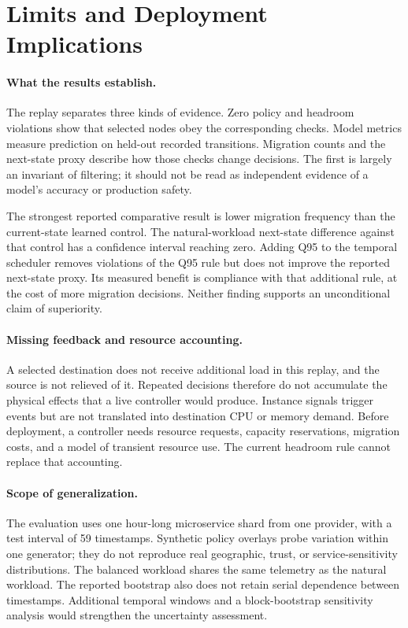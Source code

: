 \section{Limits and Deployment Implications}\label{sec:discussion}
\paragraph{What the results establish.}
The replay separates three kinds of evidence. Zero policy and headroom
violations show that selected nodes obey the corresponding checks.
Model metrics measure prediction on held-out recorded transitions.
Migration counts and the next-state proxy describe how those checks change
decisions. The first is largely an invariant of filtering; it should not
be read as independent evidence of a model's accuracy or production safety.

The strongest reported comparative result is lower migration frequency
than the current-state learned control. The natural-workload next-state
difference against that control has a confidence interval reaching zero.
Adding Q95 to the temporal scheduler removes violations of the Q95 rule
but does not improve the reported next-state proxy. Its measured benefit
is compliance with that additional rule, at the cost of more migration
decisions. Neither finding supports an unconditional claim of superiority.

\paragraph{Missing feedback and resource accounting.}
A selected destination does not receive additional load in this replay,
and the source is not relieved of it. Repeated decisions therefore do not
accumulate the physical effects that a live controller would produce.
Instance signals trigger events but are not translated into destination
CPU or memory demand. Before deployment, a controller needs resource
requests, capacity reservations, migration costs, and a model of transient
resource use. The current headroom rule cannot replace that accounting.

\paragraph{Scope of generalization.}
The evaluation uses one hour-long microservice shard from one provider,
with a test interval of 59 timestamps. Synthetic policy overlays probe
variation within one generator; they do not reproduce real geographic,
trust, or service-sensitivity distributions. The balanced workload shares
the same telemetry as the natural workload. The reported bootstrap also
does not retain serial dependence between timestamps. Additional temporal
windows and a block-bootstrap sensitivity analysis would strengthen the
uncertainty assessment.

